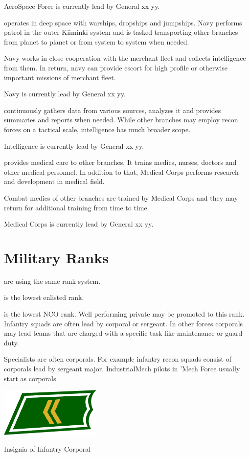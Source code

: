 \documentclass{tufte-book}
\begin{document}
AeroSpace Force is currently lead by General xx yy.

 operates in deep space with warships, dropships and
jumpships. Navy performs patrol in the outer Kiiminki system and is tasked
transporting other branches from planet to planet or from system to system
when needed.

Navy works in close cooperation with the merchant fleet and collects
intelligence from them. In return, navy can provide escort for high profile
or otherwise important missions of merchant fleet.

Navy is currently lead by General xx yy.

 continuously gathers data from various sources,
analyzes it and provides summaries and reports when needed. While other
branches may employ recon forces on a tactical scale, intelligence has much
broader scope.

Intelligence is currently lead by General xx yy.

 provides medical care to other branches. It trains
medics, nurses, doctors and other medical personnel. In addition to that,
Medical Corps performs research and development in medical field.

Combat medics of other branches are trained by Medical Corps and they may
return for additional training from time to time.

Medical Corps is currently lead by General xx yy.

\section{Military Ranks}
\label{sc:military_ranks}

 are using the same rank system.

 is the lowest enlisted rank.

 is the lowest NCO rank. Well performing private may be
promoted to this rank. Infantry squads are often lead by corporal or sergeant.
In other forces corporals may lead teams that are charged with a specific
task like maintenance or guard duty.

Specialists are often corporals. For example infantry recon squads consist
of corporals lead by sergeant major. IndustrialMech pilots in 'Mech Force
usually start as corporals.

\begin{marginfigure}[0\baselineskip]
  \includegraphics[width=5.0cm]{rank-corporal}
  \caption{Insignia of Infantry Corporal}
  \label{fig:insignia_corporal}
\end{marginfigure}
\end{document}
